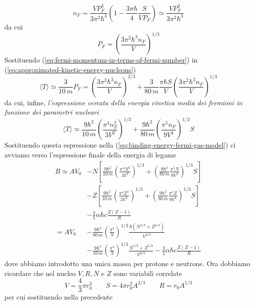 \[
n_{F} =  \frac{VP_{F}^{3}}{3 \pi^{2}\hbar^{3}} \left( 1 -  \frac{3\pi \hbar}{4} \frac{S}{V P_{F}} \right) \simeq \frac{VP_{F}^{3}}{3 \pi^{2} \hbar^{3}}
\]
da cui
\begin{equation}
	P_{F} = \left( \frac{3\pi^{2}\hbar^{3}n_{F}}{V} \right)^{1/3}
	\label{eq:fermi-momentum-in-terms-of-fermi-number}
\end{equation}
Sostituendo (\ref{eq:fermi-momentum-in-terms-of-fermi-number}) in (\ref{eq:approximated-kinetic-energy-nucleons})
\[
\langle T \rangle \simeq \frac{3}{10 \, m}     P_{F} = \left( \frac{3\pi^{2}\hbar^{3}n_{F}}{V} \right)^{2/3} + \frac{3}{80 \, m} \frac{\pi \hbar S}{V}\left( \frac{3\pi^{2}\hbar^{3}n_{F}}{V} \right)^{1/3}
\]
da cui, infine, \emph{l’espressione cercata della energia cinetica media dei fermioni in funzione dei parametri nucleari}
\[
\langle T \rangle \simeq \frac{9\hbar^{2}}{10 \, m} \left( \frac{\pi^{4}n_{F}^{2}}{3 V^{2}}\right)^{1/3}  + \frac{9\hbar^{2}}{80 \, m}\left( \frac{\pi^{5}n_{F}}{9V^{4}} \right)^{1/3}S
\]
Sostituendo questa espressione nella (\ref{eq:binding-energy-fermi-gas-model}) ci avviamo verso l’espressione finale della energia di legame
\begin{align*}
	B \simeq A V_{0} &- N \left[ \frac{9\hbar^{2}}{10\, m} \left( \frac{\pi^{4}N^{2}}{3 V^{2}} \right)^{1/3} + \left( \frac{9\hbar^{2}}{80 \, m} \frac{\pi^{5}N}{9V^{4}} \right)^{1/3}S \right] \\
	& -Z \left[ \frac{9\hbar^{2}}{10\, m} \left( \frac{\pi^{4}Z^{2}}{3 V^{2}} \right)^{1/3} + \left( \frac{9\hbar^{2}}{80 \, m} \frac{\pi^{5}Z}{9V^{4}} \right)^{1/3}S \right] \\
	& - \frac{3}{5} \alpha \hbar c \frac{Z(Z-1)}{R} \\
	= AV_{0} & - \frac{9\hbar^{2}}{80 \, m}\left( \frac{\pi^{5}}{9} \right)^{1/3} \frac{S(N^{4/3}+Z^{4/3})}{V^{4/3}} \\
	&- \frac{9\hbar^{2}}{10 \, m} \left( \frac{\pi^{4}}{3} \right)^{1/3} \frac{N^{5/3}+Z^{5/3}}{V^{2/3}} - \frac{3}{5} \alpha \hbar c \frac{Z(Z-1)}{R}
\end{align*}
dove abbiamo introdotto una unica massa per protone e neutrone.
Ora dobbiamo ricordare che nel nucleo $V, R, N$ e $Z$ sono variabili correlate
\[
V = \frac{4}{3} \pi r_{0}^{3} \qquad S = 4\pi r_{0}^{2}A^{2/3} \qquad R = r_{0}A^{1/3}
\]
per cui sostituendo nella precedente

